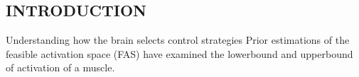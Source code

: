 \begin{introduction}
\section{INTRODUCTION}

Understanding how the brain selects control strategies  Prior estimations of the feasible activation space (FAS) have examined the lowerbound and upperbound of activation of a muscle.

\end{introduction}